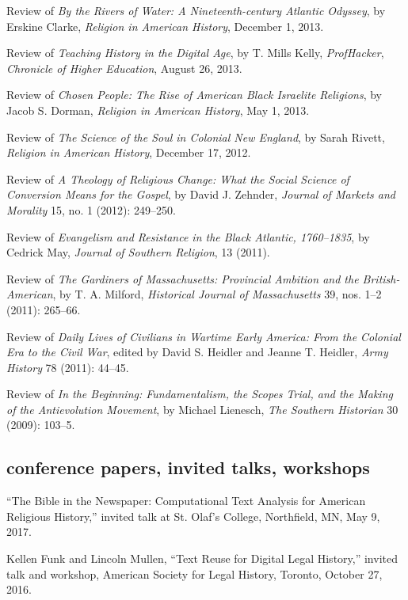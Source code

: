 \documentclass[11pt]{article}
\begin{document}
Review of \emph{By the Rivers of Water: A Nineteenth-century Atlantic
  Odyssey}, by Erskine Clarke, \emph{Religion in American History},
December 1, 2013.

Review of \emph{Teaching History in the Digital Age}, by T. Mills Kelly,
\emph{ProfHacker}, \emph{Chronicle of Higher Education}, August 26,
2013.

Review of \emph{Chosen People: The Rise of American Black Israelite
  Religions}, by Jacob S. Dorman, \emph{Religion in American History}, May
1, 2013.

Review of \emph{The Science of the Soul in Colonial New England}, by
Sarah Rivett, \emph{Religion in American History}, December 17, 2012.

Review of \emph{A Theology of Religious Change: What the Social Science
  of Conversion Means for the Gospel}, by David J. Zehnder, \emph{Journal
  of Markets and Morality} 15, no. 1 (2012): 249--250.

Review of \emph{Evangelism and Resistance in the Black Atlantic,
  1760--1835}, by Cedrick May, \emph{Journal of Southern Religion}, 13
(2011).

Review of \emph{The Gardiners of Massachusetts: Provincial Ambition and
  the British-American}, by T. A. Milford, \emph{Historical Journal of
  Massachusetts} 39, nos. 1--2 (2011): 265--66.

Review of \emph{Daily Lives of Civilians in Wartime Early America: From
  the Colonial Era to the Civil War}, edited by David S. Heidler and
Jeanne T. Heidler, \emph{Army History} 78 (2011): 44--45.

Review of \emph{In the Beginning: Fundamentalism, the Scopes Trial, and
  the Making of the Antievolution Movement}, by Michael Lienesch,
\emph{The Southern Historian} 30 (2009): 103--5.

\subsection{conference papers, invited 
  talks, workshops}\label{conference-papers-invited-talks}

``The Bible in the Newspaper: Computational Text Analysis for American 
Religious History,'' invited talk at St. Olaf's College, Northfield, MN, May 
9, 2017.


Kellen Funk and Lincoln Mullen, ``Text Reuse for Digital Legal History,'' 
invited talk and workshop, American Society for Legal History, Toronto, October 27, 2016.
\end{document}
